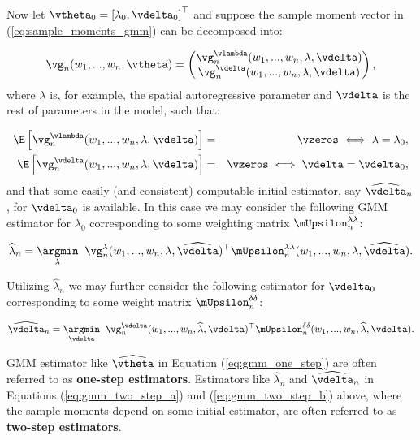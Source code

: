 \documentclass[english,12pt]{book}\usepackage[]{graphicx}\usepackage[]{xcolor}
\begin{document}
Now let $\vtheta_0 = \left[\lambda_0, \vdelta_0\right]^\top$ and suppose the sample moment vector in (\ref{eq:sample_moments_gmm}) can be decomposed into:

\begin{equation*}
\vg_n(w_1,...,w_n, \vtheta) = \begin{pmatrix}
\vg_n^{\vlambda}(w_1,...,w_n, \lambda, \vdelta) \\
\vg_n^{\vdelta}(w_1,...,w_n, \lambda, \vdelta) 
\end{pmatrix},
\end{equation*}
%
where $\lambda$ is, for example, the spatial autoregressive parameter and $\vdelta$ is the rest of parameters in the model, such that:

\begin{eqnarray*}
\E\left[\vg_n^{\vlambda}(w_1,...,w_n, \lambda, \vdelta)\right] &=& \vzeros \iff \lambda = \lambda_0,\\
\E\left[\vg_n^{\vdelta}(w_1,...,w_n, \lambda, \vdelta)\right] &=& \vzeros \iff \vdelta = \vdelta_0,
\end{eqnarray*}
%
and that some easily (and consistent) computable initial estimator, say $\widehat{\vdelta}_n$, for $\vdelta_0$ is available. In this case we may consider the following GMM estimator for $\lambda_0$ corresponding to some weighting matrix $\mUpsilon^{\lambda\lambda}_n$:

\begin{equation}\label{eq:gmm_two_step_a}
\widehat{\lambda}_n = \underset{\lambda}{\argmin}\;\;\vg_n^{\lambda}(w_1,...,w_n, \lambda, \widehat{\vdelta})^\top\mUpsilon^{\lambda\lambda}_n(w_1,...,w_n, \lambda, \widehat{\vdelta}).
\end{equation}

Utilizing $\widehat{\lambda}_n$ we may further consider the following estimator for $\vdelta_0$ corresponding to some weight matrix $\mUpsilon^{\delta\delta}_n$:

\begin{equation}\label{eq:gmm_two_step_b}
\widehat{\vdelta}_n = \underset{\vdelta}{\argmin}\;\;\vg_n^{\vdelta}(w_1,...,w_n, \widehat{\lambda}, \vdelta)^\top\mUpsilon^{\delta\delta}_n(w_1,...,w_n, \widehat{\lambda}, \vdelta).
\end{equation}

GMM estimator like $\widehat{\vtheta}$ in Equation (\ref{eq:gmm_one_step}) are often referred to as \textbf{one-step estimators}. Estimators like $\widehat{\lambda}_n$ and $\widehat{\vdelta}_n$ in Equations (\ref{eq:gmm_two_step_a}) and (\ref{eq:gmm_two_step_b}) above, where the sample moments depend on some initial estimator, are often referred to as \textbf{two-step estimators}.
\end{document}
